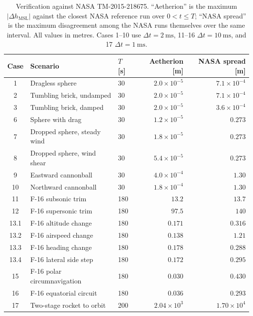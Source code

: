 \documentclass[preprint,12pt,a4paper]{elsarticle}
\begin{document}
\begin{table}[!h]
  \centering
  \caption{Verification against NASA TM-2015-218675. ``Aetherion'' is the
    maximum $\lvert\Delta h_{\mathrm{MSL}}\rvert$ against the closest NASA
    reference run over $0 < t \leq T$; ``NASA spread'' is the maximum
    disagreement among the NASA runs themselves over the same interval. All
    values in metres. Cases 1--10 use $\Delta t = \SI{2}{\milli\second}$,
    11--16 $\Delta t = \SI{10}{\milli\second}$, and 17
    $\Delta t = \SI{1}{\milli\second}$.}
  \label{tab:verification}
  \footnotesize
  \begin{tabular}{cllrr}
    \toprule
    Case & Scenario & $T$ [s] & Aetherion [m] & NASA spread [m] \\
    \midrule
     1 & Dragless sphere              & 30  & $2.0\times10^{-5}$ & $7.1\times10^{-4}$ \\
     2 & Tumbling brick, undamped     & 30  & $2.0\times10^{-5}$ & $7.1\times10^{-4}$ \\
     3 & Tumbling brick, damped       & 30  & $2.0\times10^{-5}$ & $3.6\times10^{-4}$ \\
     6 & Sphere with drag             & 30  & $1.2\times10^{-5}$ & $0.273$ \\
     7 & Dropped sphere, steady wind  & 30  & $1.8\times10^{-5}$ & $0.273$ \\
     8 & Dropped sphere, wind shear   & 30  & $5.4\times10^{-5}$ & $0.273$ \\
     9 & Eastward cannonball          & 30  & $4.0\times10^{-4}$ & $1.30$ \\
    10 & Northward cannonball         & 30  & $1.8\times10^{-4}$ & $1.30$ \\
    11 & F-16 subsonic trim           & 180 & $13.2$  & $13.7$  \\
    12 & F-16 supersonic trim         & 180 & $97.5$  & $140$   \\
    13.1 & F-16 altitude change       & 180 & $0.171$ & $0.316$ \\
    13.2 & F-16 airspeed change       & 180 & $0.138$ & $1.21$  \\
    13.3 & F-16 heading change        & 180 & $0.178$ & $0.288$ \\
    13.4 & F-16 lateral side step     & 180 & $0.172$ & $0.295$ \\
    15 & F-16 polar circumnavigation  & 180 & $0.030$ & $0.430$ \\
    16 & F-16 equatorial circuit      & 180 & $0.036$ & $0.293$ \\
    17 & Two-stage rocket to orbit    & 200 & $2.04\times10^{3}$ & $1.70\times10^{4}$ \\
    \bottomrule
  \end{tabular}
\end{table}
\end{document}
